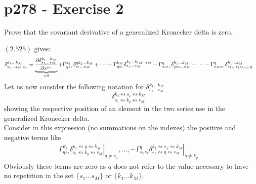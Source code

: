 \section{p278 - Exercise 2 }
\begin{tcolorbox}
Prove that the covariant derivative of a generalized Kronecker delta is zero.
\end{tcolorbox}
$\mathbf{(2.525)}$  gives: 
\begin{align}
\delta^{k_1\dots k_M}_{s_1 \dots s_M|s_{\tau}} &= \underbrace{\pdv{\delta^{k_1\dots k_M}_{s_1 \dots s_M}}{x^{s_{\tau}}}}_\text{=0} + \Gamma^{k_1}_{q s_{\tau}}\delta^{q k_2\dots k_M}_{s_1 \dots s_M}+ \dots +\Gamma^{k_M}_{q s_{\tau}}\delta^{ k_1\dots k_{(M-1)}q}_{s_1 \dots s_M} - \Gamma^{q}_{ s_1 s_{\tau}}\delta^{ k_1\dots k_{M}}_{qs_2 \dots s_M} -\dots -\Gamma^{q}_{ s_M s_{\tau}}\delta^{ k_1\dots k_{M}}_{s_1 \dots s_{(M-1)}q}\\
\end{align}
Let us now consider the following notation for $\delta^{k_1\dots k_M}_{s_1 \dots s_M}$
$$\delta^{k_1 \leftrightsquigarrow s_x\leftrightsquigarrow  k_M}_{s_1 \leftrightsquigarrow k_y\leftrightsquigarrow s_M}$$
showing the respective position of an element in the two series use in the generalized Kronecker delta.\\
Consider in this expression (no summations on the indexes) the positive and negative terms like
\begin{align}
\left.\Gamma^{k_y}_{q s_{\tau}}\delta^{k_1 \leftrightsquigarrow q\leftrightsquigarrow  k_M}_{s_1 \leftrightsquigarrow k_y\leftrightsquigarrow s_M}\right|_{q\ne s_x},\dots ,- \left.\Gamma^{q}_{ s_x s_{\tau}}\delta^{k_1 \leftrightsquigarrow s_x\leftrightsquigarrow  k_M}_{s_1 \leftrightsquigarrow q\leftrightsquigarrow s_M}\right|_{q\ne k_y}
\end{align} 
Obviously these terms are zero as $q$ does not refer to the value necessary to have no repetition in the set $\{s_1 \dots s_M\}$ or $\{k_1 \dots k_M\}$.\\

